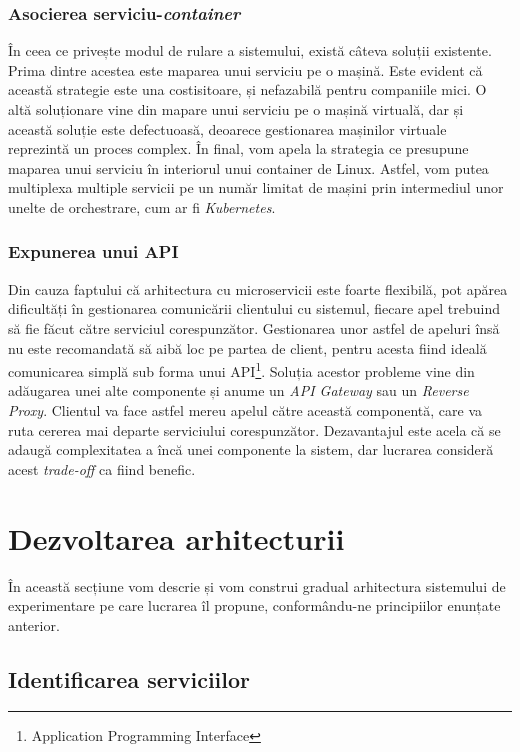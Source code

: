 \subsubsection{Asocierea serviciu-\textit{container}}

În ceea ce privește modul de rulare a sistemului, există câteva soluții existente. Prima dintre acestea este maparea unui serviciu pe o mașină. Este evident că această strategie este una costisitoare, și nefazabilă pentru companiile mici. O altă soluționare vine din mapare unui serviciu pe o mașină virtuală, dar și această soluție este defectuoasă, deoarece gestionarea mașinilor virtuale reprezintă un proces complex. În final, vom apela la strategia ce presupune maparea unui serviciu în interiorul unui container de Linux. Astfel, vom putea multiplexa multiple servicii pe un număr limitat de mașini prin intermediul unor unelte de orchestrare, cum ar fi \textit{Kubernetes}.

\subsubsection{Expunerea unui API}

Din cauza faptului că arhitectura cu microservicii este foarte flexibilă, pot apărea dificultăți în gestionarea comunicării clientului cu sistemul, fiecare apel trebuind să fie făcut către serviciul corespunzător. Gestionarea unor astfel de apeluri însă nu este recomandată să aibă loc pe partea de client, pentru acesta fiind ideală comunicarea simplă sub forma unui API\footnote{Application Programming Interface}. Soluția acestor probleme vine din adăugarea unei alte componente și anume un \textit{API Gateway} sau un \textit{Reverse Proxy}. Clientul va face astfel mereu apelul către această componentă, care va ruta cererea mai departe serviciului corespunzător. Dezavantajul este acela că se adaugă complexitatea a încă unei componente la sistem, dar lucrarea consideră acest \textit{trade-off} ca fiind benefic. 

\section{Dezvoltarea arhitecturii}

În această secțiune vom descrie și vom construi gradual arhitectura sistemului de experimentare pe care lucrarea îl propune, conformându-ne principiilor enunțate anterior.

\subsection{Identificarea serviciilor}

